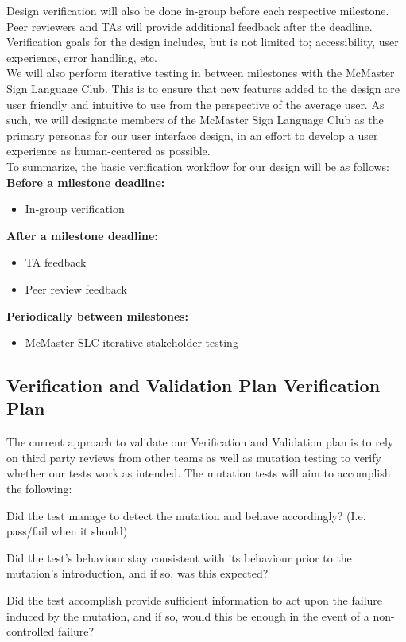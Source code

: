 \documentclass[12pt, titlepage]{article}
\begin{document}
Design verification will also be done in-group before each respective milestone. Peer reviewers and TAs will provide additional feedback
after the deadline. Verification goals for the design includes, but is not limited to; accessibility, user experience, error handling, etc.\\
We will also perform iterative testing in between milestones with the McMaster Sign Language Club. This is to ensure that new features
added to the design are user friendly and intuitive to use from the perspective of the average user. As such, we will designate members
of the McMaster Sign Language Club as the primary personas for our user interface design, in an effort to develop a user experience as
human-centered as possible.\\

To summarize, the basic verification workflow for our design will be as follows:\\
\textbf{Before a milestone deadline:}\\
\begin{itemize}
  \item In-group verification
\end{itemize}

\noindent \textbf{After a milestone deadline:}\\
\begin{itemize}
  \item TA feedback
  \item Peer review feedback
\end{itemize}

\noindent \textbf{Periodically between milestones:}\\
\begin{itemize}
  \item McMaster SLC iterative stakeholder testing
\end{itemize}

\subsection{Verification and Validation Plan Verification Plan}

The current approach to validate our Verification and Validation plan is to rely on third party reviews from other teams as well as mutation testing to verify whether our tests work as intended. The mutation tests will aim to accomplish the following:

\begin{todolist}
\item Did the test manage to detect the mutation and behave accordingly? (I.e. pass/fail when it should)
\item Did the test's behaviour stay consistent with its behaviour prior to the mutation's introduction, and if so, was this expected?
\item Did the test accomplish provide sufficient information to act upon the failure induced by the mutation, and if so, would this be enough in the event of a non-controlled failure?
\end{todolist}
\end{document}
